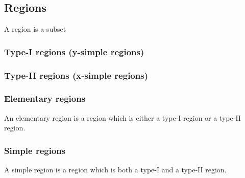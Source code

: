 
\subsection{Regions}

A region is a subset

\subsubsection{Type-I regions (y-simple regions)}

\subsubsection{Type-II regions (x-simple regions)}

\subsubsection{Elementary regions}

An elementary region is a region which is either a type-I region or a type-II region. 

\subsubsection{Simple regions}

A simple region is a region which is both a type-I and a type-II region.

